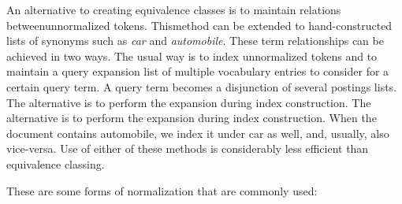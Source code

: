 \documentclass[letterpaper,11pt]{article}
\begin{document}
An alternative to creating equivalence classes is to maintain relations betweenunnormalized tokens. Thismethod can be extended to hand-constructed lists of synonyms such as \textit{car} and \textit{automobile}. These term relationships can be achieved in two ways. The usual way is to index unnormalized tokens and to maintain a query expansion list of multiple vocabulary entries to consider for a certain query term. A query term becomes a disjunction of several postings lists. The alternative is to perform the expansion during index construction. The alternative is to perform the expansion during index construction. When the document contains automobile, we index it under car as well, and, usually, also vice-versa. Use of either of these methods is considerably less efficient than equivalence classing.

These are some forms of normalization that are commonly used:
\end{document}
